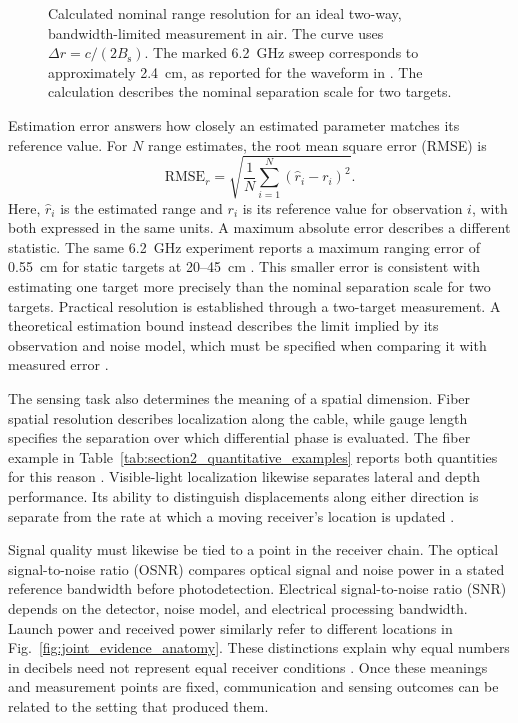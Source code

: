 \begin{figure}[!t]
\centering

\caption{Calculated nominal range resolution for an ideal two-way,
bandwidth-limited measurement in air. The curve uses
$\Delta r=c/(2B_{\mathrm{s}})$. The marked 6.2~GHz sweep corresponds to
approximately 2.4~cm, as reported for the waveform in
\cite{OISAC_SCR00083}. The calculation describes the nominal separation scale
for two targets.}
\label{fig:bandwidth_resolution}
\end{figure}

Estimation error answers how closely an estimated parameter matches its
reference value. For $N$ range estimates, the root mean square error (RMSE) is
\begin{equation}
\mathrm{RMSE}_{r}=
\sqrt{\frac{1}{N}\sum_{i=1}^{N}(\hat r_i-r_i)^2}.
\label{eq:ranging_rmse}
\end{equation}
Here, $\hat r_i$ is the estimated range and $r_i$ is its reference value for
observation $i$, with both expressed in the same units.
A maximum absolute error describes a different statistic. The same
6.2~GHz experiment reports a maximum ranging error of 0.55~cm for static
targets at 20--45~cm \cite{OISAC_SCR00083}. This smaller error is consistent
with estimating one target more precisely than the nominal separation scale
for two targets. Practical resolution is established through a two-target
measurement. A theoretical estimation bound instead describes the limit
implied by its observation and noise model, which must be specified when
comparing it with measured error \cite{Wen2024OISACArchitectures}.

The sensing task also determines the meaning of a spatial dimension.
Fiber spatial resolution describes localization along the cable, while gauge
length specifies the separation over which differential phase is evaluated.
The fiber example in Table~\ref{tab:section2_quantitative_examples} reports
both quantities for this reason \cite{OISAC_SCR00057}.
Visible-light localization likewise separates lateral and depth performance.
Its ability to distinguish displacements along either direction is separate
from the rate at which a moving receiver's location is updated
\cite{OISAC_SCR00196}.

Signal quality must likewise be tied to a point in the receiver chain.
The optical signal-to-noise ratio (OSNR) compares optical signal and
noise power in a stated reference bandwidth before photodetection. Electrical
signal-to-noise ratio (SNR) depends on the detector, noise model, and electrical processing bandwidth.
Launch power and received power similarly refer to different locations in
Fig.~\ref{fig:joint_evidence_anatomy}. These distinctions explain why equal
numbers in decibels need not represent equal receiver conditions
\cite{OISAC_SCR00220,OISAC_SCR01180}.
Once these meanings and measurement points are fixed, communication and
sensing outcomes can be related to the setting that produced them.

